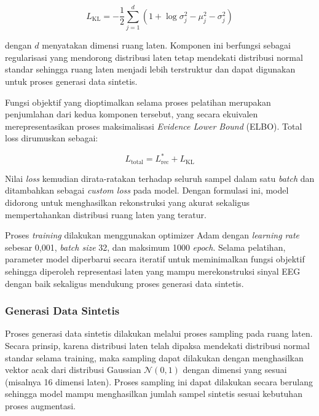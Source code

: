 \begin{equation}
L_{\mathrm{KL}}
=
-\frac{1}{2}
\sum_{j=1}^{d}
\left(
1 + \log \sigma_j^2
- \mu_j^2
- \sigma_j^2
\right)
\end{equation}

dengan $d$ menyatakan dimensi ruang laten. Komponen ini berfungsi sebagai regularisasi yang mendorong distribusi laten tetap mendekati distribusi normal standar sehingga ruang laten menjadi lebih terstruktur dan dapat digunakan untuk proses generasi data sintetis.

Fungsi objektif yang dioptimalkan selama proses pelatihan merupakan penjumlahan dari kedua komponen tersebut, yang secara ekuivalen merepresentasikan proses maksimalisasi \textit{Evidence Lower Bound} (ELBO). Total loss dirumuskan sebagai:

\begin{equation}
L_{\mathrm{total}} = L_{\mathrm{rec}}^{*} + L_{\mathrm{KL}}
\end{equation}

Nilai \textit{loss} kemudian dirata-ratakan terhadap seluruh sampel dalam satu \textit{batch} dan ditambahkan sebagai \textit{custom loss} pada model. Dengan formulasi ini, model didorong untuk menghasilkan rekonstruksi yang akurat sekaligus mempertahankan distribusi ruang laten yang teratur.

Proses \textit{training} dilakukan menggunakan optimizer Adam dengan \textit{learning rate} sebesar 0{,}001, \textit{batch size} 32, dan maksimum 1000 \textit{epoch}. Selama pelatihan, parameter model diperbarui secara iteratif untuk meminimalkan fungsi objektif sehingga diperoleh representasi laten yang mampu merekonstruksi sinyal EEG dengan baik sekaligus mendukung proses generasi data sintetis.


\subsubsection{Generasi Data Sintetis}

Proses generasi data sintetis dilakukan melalui proses sampling pada ruang laten. Secara prinsip, karena distribusi laten telah dipaksa mendekati distribusi normal standar selama training, maka sampling dapat dilakukan dengan menghasilkan vektor acak dari distribusi Gaussian $\mathcal{N}(0,1)$ dengan dimensi yang sesuai (misalnya 16 dimensi laten). Proses sampling ini dapat dilakukan secara berulang sehingga model mampu menghasilkan jumlah sampel sintetis sesuai kebutuhan proses augmentasi.

